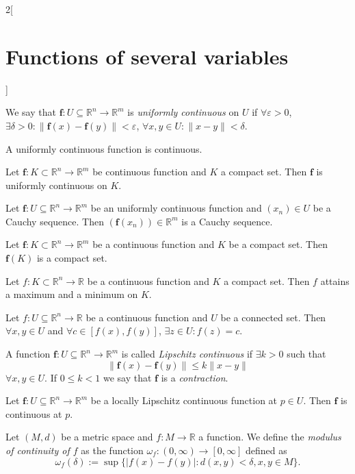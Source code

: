 \documentclass[class=article,10pt,crop=false]{standalone}
\begin{document}
\begin{multicols}{2}[\section{Functions of several variables}]
\begin{definition}
We say that $\mathbf{\boldsymbol{f}}:U\subseteq\mathbb{R}^n\rightarrow\mathbb{R}^m$ is \textit{uniformly continuous} on $U$ if $\forall\varepsilon>0$, $\exists\delta>0:\|\mathbf{\boldsymbol{f}}(x)-\mathbf{\boldsymbol{f}}(y)\|<\varepsilon$, $\forall x,y\in U:\|x-y\|<\delta$.
\end{definition}
\begin{corollary}
A uniformly continuous function is continuous.
\end{corollary}
\begin{theorem}
Let $\mathbf{\boldsymbol{f}}:K\subset\mathbb{R}^n\rightarrow\mathbb{R}^m$ be continuous function and $K$ a compact set. Then $\mathbf{\boldsymbol{f}}$ is uniformly continuous on $K$.
\end{theorem}
\begin{theorem}
Let $\mathbf{\boldsymbol{f}}:U\subseteq\mathbb{R}^n\rightarrow\mathbb{R}^m$ be an uniformly continuous function and $(x_n)\in U$ be a Cauchy sequence. Then $(\mathbf{\boldsymbol{f}}(x_n))\in\mathbb{R}^m$ is a Cauchy sequence.
\end{theorem}
\begin{theorem}
Let $\mathbf{\boldsymbol{f}}:K\subset\mathbb{R}^n\rightarrow\mathbb{R}^m$ be a continuous function and $K$ be a compact set. Then $\mathbf{\boldsymbol{f}}(K)$ is a compact set.
\end{theorem}
\begin{theorem}
Let $f:K\subset\mathbb{R}^n\rightarrow\mathbb{R}$ be a continuous function and $K$ a compact set. Then $f$ attains a maximum and a minimum on $K$.
\end{theorem}
\begin{theorem}
Let $f:U\subseteq\mathbb{R}^n\rightarrow\mathbb{R}$ be a continuous function and $U$ be a connected set. Then $\forall x,y\in U$ and $\forall c\in[f(x),f(y)]$, $\exists z\in U:f(z)=c$.
\end{theorem}
\begin{definition}
A function $\mathbf{\boldsymbol{f}}:U\subseteq\mathbb{R}^n\rightarrow\mathbb{R}^m$ is called \textit{Lipschitz continuous} if $\exists k>0$ such that $$\|\mathbf{\boldsymbol{f}}(x)-\mathbf{\boldsymbol{f}}(y)\|\leq k\|x-y\|$$ $\forall x,y\in U$. If $0\leq k<1$ we say that $\mathbf{\boldsymbol{f}}$ is a \textit{contraction}.
\label{FOSV_contr}
\end{definition}
\begin{prop}
Let $\mathbf{\boldsymbol{f}}:U\subseteq\mathbb{R}^n\rightarrow\mathbb{R}^m$ be a locally Lipschitz continuous function at $p\in U$. Then $\mathbf{\boldsymbol{f}}$ is continuous at $p$.
\end{prop}
\begin{definition}
Let $(M,d)$ be a metric space and $f:M\rightarrow\mathbb{R}$ a function. We define the \textit{modulus of continuity of $f$} as the function $\omega_f:(0,\infty)\rightarrow[0,\infty]$ defined as $$\omega_f(\delta):=\sup\{|f(x)-f(y)|:d(x,y)<\delta, x,y\in M\}.$$
\end{definition}

\end{multicols}
\end{document}
